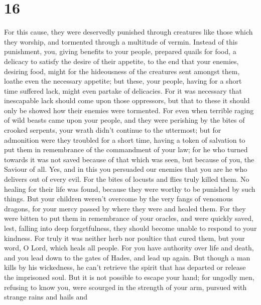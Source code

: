 \hypertarget{section-10}{%
\section{16}\label{section-10}}

 For this cause, they were deservedly punished through
creatures like those which they worship, and tormented through a
multitude of vermin.  Instead of this punishment, you,
giving benefits to your people, prepared quails for food, a delicacy to
satisfy the desire of their appetite,  to the end that your
enemies, desiring food, might for the hideousness of the creatures sent
amongst them, loathe even the necessary appetite; but these, your
people, having for a short time suffered lack, might even partake of
delicacies.  For it was necessary that inescapable lack
should come upon those oppressors, but that to these it should only be
showed how their enemies were tormented.  For even when
terrible raging of wild beasts came upon your people, and they were
perishing by the bites of crooked serpents, your wrath didn't continue
to the uttermost;  but for admonition were they troubled for
a short time, having a token of salvation to put them in remembrance of
the commandment of your law;  for he who turned towards it
was not saved because of that which was seen, but because of you, the
Saviour of all.  Yes, and in this you persuaded our enemies
that you are he who delivers out of every evil.  For the
bites of locusts and flies truly killed them. No healing for their life
was found, because they were worthy to be punished by such things.
 But your children weren't overcome by the very fangs of
venomous dragons, for your mercy passed by where they were and healed
them.  For they were bitten to put them in remembrance of
your oracles, and were quickly saved, lest, falling into deep
forgetfulness, they should become unable to respond to your kindness.
 For truly it was neither herb nor poultice that cured
them, but your word, O Lord, which heals all people.  For
you have authority over life and death, and you lead down to the gates
of Hades, and lead up again.  But though a man kills by his
wickedness, he can't retrieve the spirit that has departed or release
the imprisoned soul.  But it is not possible to escape your
hand;  for ungodly men, refusing to know you, were scourged
in the strength of your arm, pursued with strange rains and hails and
